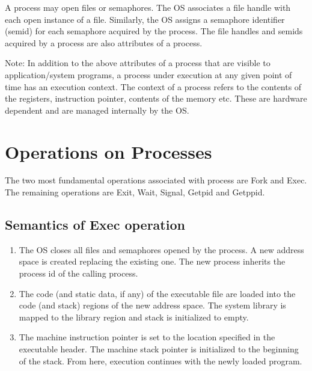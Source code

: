 A process may open files or semaphores. The OS associates a file handle with each open instance of a file. Similarly, the OS assigns a semaphore identifier (semid) for each semaphore acquired by the process. The file handles and semids acquired by a process are also attributes of a process.

Note: In addition to the above attributes of a process that are visible to application/system programs, a process under execution at any given point of time has an execution context. The context of a process refers to the contents of the registers, instruction pointer, contents of the memory etc. These are hardware dependent and are managed internally by the OS. 

\section{Operations on Processes}
The two most fundamental operations associated with process are Fork and Exec. The remaining operations are Exit, Wait, Signal, Getpid and Getppid.

\subsection{Semantics of Exec operation}
\begin{enumerate}
\item The OS closes all files and semaphores opened by the process. A new address space is created replacing the existing one. The new process inherits the process id of the calling process.
\item The code (and static data, if any) of the executable file are loaded into the code (and stack) regions of the new address space. The system library is mapped to the library region and stack is initialized to empty.
\item The machine instruction pointer is set to the location specified in the executable header. The machine stack pointer is initialized to the beginning of the stack. From here, execution continues with the newly loaded program.
\end{enumerate}

